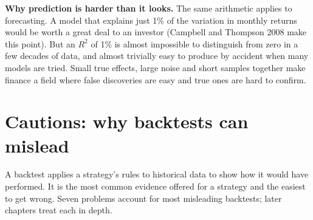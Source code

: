 
\textbf{Why prediction is harder than it looks.} The same arithmetic applies to forecasting. A model that explains just 1\% of the variation in monthly returns would be worth a great deal to an investor (Campbell and Thompson 2008 make this point). But an $R^2$ of 1\% is almost impossible to distinguish from zero in a few decades of data, and almost trivially easy to produce by accident when many models are tried. Small true effects, large noise and short samples together make finance a field where false discoveries are easy and true ones are hard to confirm.

\section{Cautions: why backtests can mislead}
\label{sec:01-backtests}

A backtest applies a strategy's rules to historical data to show how it would have performed. It is the most common evidence offered for a strategy and the easiest to get wrong. Seven problems account for most misleading backtests; later chapters treat each in depth.


